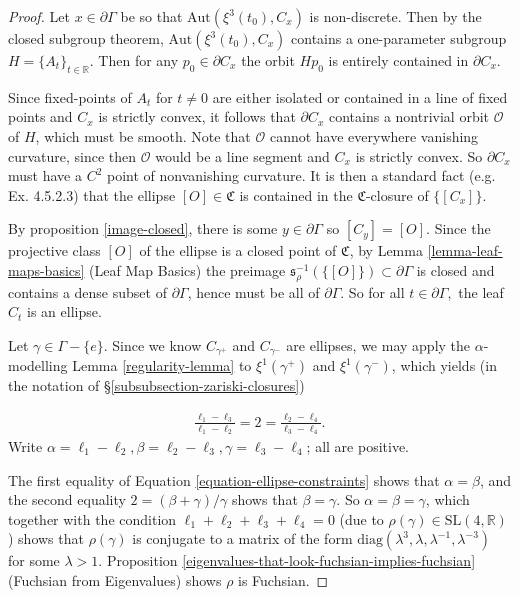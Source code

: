 \documentclass[12pt,a4paper]{amsart}
\newcommand{\bbR}{\mathbb R}
\theoremstyle{definition}
\theoremstyle{plain}
\numberwithin{equation}{section}
\begin{document}
\begin{proof}
    Let $x \in \partial \Gamma$ be so that $\text{Aut}(\xi^3(t_0), C_x)$ is non-discrete. Then by the closed subgroup theorem, $\text{Aut}(\xi^3(t_0), C_x)$ contains a one-parameter subgroup $H = \{ A_t \}_{t \in \bbR}$. Then for any $p_0 \in \partial C_x$ the orbit $Hp_0$ is entirely contained in $\partial C_x$.
    
    Since fixed-points of $A_t$ for $t \neq 0$ are either isolated or contained in a line of fixed points and $C_x$ is strictly convex, it follows that $\partial C_x$ contains a nontrivial orbit $\mathcal{O}$ of $H$, which must be smooth. Note that $\mathcal{O}$ cannot have everywhere vanishing curvature, since then $\mathcal{O}$ would be a line segment and $C_x$ is strictly convex. So $\partial C_x$ must have a $C^2$ point of nonvanishing curvature. It is then a standard fact (e.g. \cite{goldman2022geometric} Ex. 4.5.2.3) that the ellipse $[O] \in \mathfrak{C}$ is contained in the $\mathfrak{C}$-closure of $\{ [C_x]\}$. 

    By proposition \ref{image-closed}, there is some $y \in \partial \Gamma$ so $[C_y] = [O]$. Since the projective class $[O]$ of the ellipse is a closed point of $\mathfrak{C}$, by Lemma \ref{lemma-leaf-maps-basics} (Leaf Map Basics) the preimage $\mathfrak{s}_\rho^{-1}(\{[O]\}) \subset \partial \Gamma$ is closed and contains a dense subset of $\partial \Gamma$, hence must be all of $\partial \Gamma$. So for all $t \in \partial \Gamma,$ the leaf $C_t$ is an ellipse.
  
  Let $\gamma \in \Gamma - \{e\}$. Since we know $C_{\gamma^+}$ and $C_{\gamma^-}$ are ellipses, we may apply the $\alpha$-modelling Lemma \ref{regularity-lemma} to $\xi^1(\gamma^+)$ and $\xi^1(\gamma^-)$, which yields (in the notation of \S\ref{subsubsection-zariski-closures})

  \begin{align}\label{equation-ellipse-constraints} \frac{\ell_1 - \ell_3}{\ell_1 - \ell_2} =2 = \frac{\ell_2 - \ell_4}{\ell_3 - \ell_4}.\end{align} Write $\alpha = \ell_1 - \ell_2, \beta = \ell_2 - \ell_3, \gamma = \ell_3 - \ell_4$; all are positive.
  
  The first equality of Equation \ref{equation-ellipse-constraints} shows that $\alpha = \beta$, and the second equality $2 = (\beta + \gamma)/\gamma$ shows that $\beta = \gamma$. So $\alpha =\beta = \gamma$, which together with the condition $\ell_1 +\ell_2 + \ell_3 + \ell_4 =0$ (due to $\rho(\gamma) \in \text{SL}(4,\bbR)$) shows that $\rho(\gamma)$ is conjugate to a matrix of the form $\text{diag}(\lambda^3, \lambda, \lambda^{-1}, \lambda^{-3})$ for some $\lambda > 1$. Proposition \ref{eigenvalues-that-look-fuchsian-implies-fuchsian} (Fuchsian from Eigenvalues) shows $\rho$ is Fuchsian. \end{proof}
\end{document}
